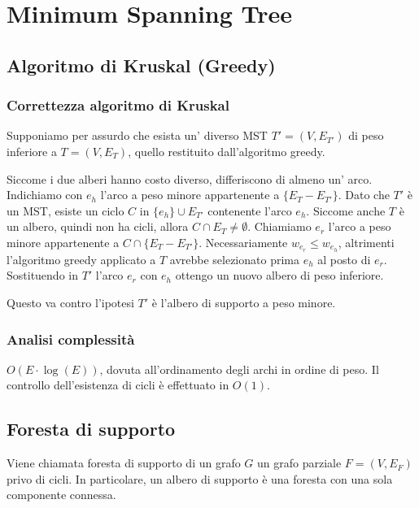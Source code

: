 \documentclass[../template]{subfiles}
\begin{document}
\section{Minimum Spanning Tree}
\subsection{Algoritmo di Kruskal (Greedy)}
\begin{center}
\end{center}

\subsubsection{Correttezza algoritmo di Kruskal}
Supponiamo per assurdo che esista un' diverso MST $T' = (V,E_{T'})$ di peso inferiore a $T = (V, E_T)$,
quello restituito dall'algoritmo greedy.

Siccome i due alberi hanno costo diverso, differiscono di almeno un' arco.
Indichiamo con $e_h$ l'arco a peso minore appartenente a $\{E_T - E_{T'}\}$.
Dato che $T'$ è un MST, esiste un ciclo $C$ in $\{e_h\} \cup E_{T'}$ contenente l'arco $e_h$.
Siccome anche $T$ è un albero, quindi non ha cicli, allora $C \cap E_{T} \neq \emptyset$.
Chiamiamo $e_r$ l'arco a peso minore appartenente a $C \cap \{E_{T} - E_{T'}\}$.
Necessariamente $w_{e_r} \le w_{e_h}$, altrimenti l'algoritmo greedy applicato a $T$ avrebbe selezionato prima $e_h$ al posto di $e_r$.
Sostituendo in $T'$ l'arco $e_r$ con $e_h$ ottengo un nuovo albero di peso inferiore.

Questo va contro l'ipotesi $T'$ è l'albero di supporto a peso minore.
\subsubsection{Analisi complessità}
$O(E \cdot \log (E))$, dovuta all'ordinamento degli archi in ordine di peso.
Il controllo dell'esistenza di cicli è effettuato in $O(1)$.

\subsection{Foresta di supporto}
Viene chiamata foresta di supporto di un grafo $G$ un grafo parziale $F = (V, E_F)$ privo di cicli. In particolare, un albero di
supporto è una foresta con una sola componente connessa.
\end{document}
